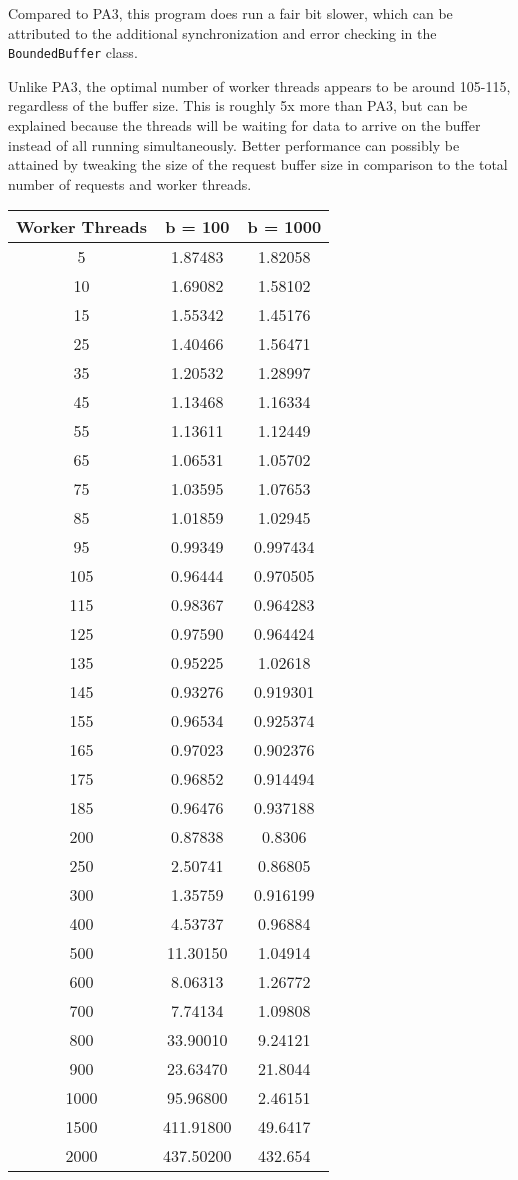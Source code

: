 \documentclass[10pt]{article}
\begin{document}
Compared to PA3, this program does run a fair bit slower, which can be attributed to the additional synchronization and error checking in the \texttt{BoundedBuffer} class.

Unlike PA3, the optimal number of worker threads appears to be around 105-115, regardless of the buffer size. This is roughly 5x more than PA3, but can be explained because the threads will be waiting for data to arrive on the buffer instead of all running simultaneously. Better performance can possibly be attained by tweaking the size of the request buffer size in comparison to the total number of requests and worker threads.

\begin{table}[h]
\begin{tabular}{c|c|c}
\textbf{Worker Threads} & \textbf{b = 100} & \textbf{b = 1000} \\ \hline
5 & 1.87483 & 1.82058 \\
10 & 1.69082 & 1.58102 \\
15 & 1.55342 & 1.45176 \\
25 & 1.40466 & 1.56471 \\
35 & 1.20532 & 1.28997 \\
45 & 1.13468 & 1.16334 \\
55 & 1.13611 & 1.12449 \\
65 & 1.06531 & 1.05702 \\
75 & 1.03595 & 1.07653 \\
85 & 1.01859 & 1.02945 \\
95 & 0.99349 & 0.997434 \\
105 & 0.96444 & 0.970505 \\
115 & 0.98367 & 0.964283 \\
125 & 0.97590 & 0.964424 \\
135 & 0.95225 & 1.02618 \\
145 & 0.93276 & 0.919301 \\
155 & 0.96534 & 0.925374 \\
165 & 0.97023 & 0.902376 \\
175 & 0.96852 & 0.914494 \\
185 & 0.96476 & 0.937188 \\
200 & 0.87838 & 0.8306 \\
250 & 2.50741 & 0.86805 \\
300 & 1.35759 & 0.916199 \\
400 & 4.53737 & 0.96884 \\
500 & 11.30150 & 1.04914 \\
600 & 8.06313 & 1.26772 \\
700 & 7.74134 & 1.09808 \\
800 & 33.90010 & 9.24121 \\
900 & 23.63470 & 21.8044 \\
1000 & 95.96800 & 2.46151 \\
1500 & 411.91800 & 49.6417 \\
2000 & 437.50200 & 432.654
\end{tabular}
\end{table}
\end{document}
